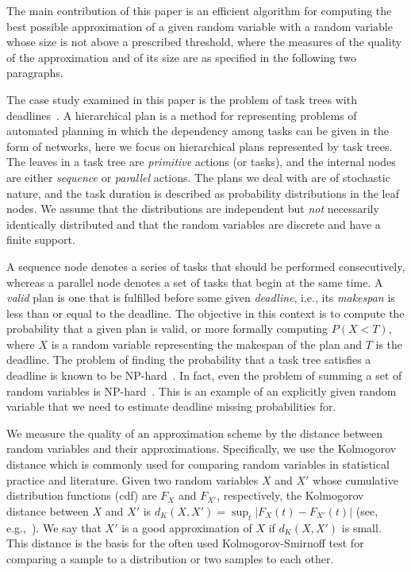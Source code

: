 \documentclass[letterpaper]{article} %
\begin{document}
The main contribution of this paper is an efficient algorithm for computing the best possible approximation of a given random variable with a random variable whose size is not above a prescribed threshold, where the measures of the quality of the approximation and of its size are as specified in the following two paragraphs. 

The case study examined in this paper is the problem of task trees with deadlines~\cite{cohen2015estimating,CohenGW18}. A hierarchical plan is a method for representing problems of automated planning in which the dependency among tasks can be given in the form of networks, here we focus on hierarchical plans represented by task trees. The leaves in a task tree are \emph{primitive} actions (or tasks), and the internal nodes are either \emph{sequence} or \emph{parallel} actions. The plans we deal with are of stochastic nature, and the task duration is described as probability distributions in the leaf nodes. We assume that the distributions are independent but {\em not} necessarily identically distributed and that the random variables are discrete and have a finite support. 

A sequence node denotes a series of tasks that should be performed consecutively, whereas a parallel node denotes a set of tasks that begin at the same time. A \emph{valid} plan is one that is fulfilled before some given \emph{deadline}, i.e., its \emph{makespan} is less than or equal to the deadline. The objective in this context is to compute the probability that a given plan is valid, or more formally computing $P(X<T)$, where $X$ is a random variable representing the makespan of the plan and $T$ is the deadline. The problem of finding the probability that a task tree satisfies a deadline is known to be NP-hard~\cite{cohen2015estimating}. In fact, even the problem of summing a set of random variables is NP-hard~\cite{mohring2001scheduling}. This is an example of an explicitly given random variable that we need to estimate deadline missing probabilities for.

We measure the quality of an approximation scheme by the distance between random variables and their approximations. Specifically, we use the Kolmogorov distance which is  commonly used for comparing random variables in statistical practice and literature. Given two random variables $X$ and $X'$ whose cumulative distribution functions (cdf) are $F_X$ and $F_{X'}$, respectively, the Kolmogorov distance between $X$ and $X'$ is $d_K(X,X')= \sup_t |F_X(t) - F_{X'}(t)|$ (see, e.g.,~\cite{gibbons2011nonparametric}). We say that $X'$ is a good approximation of $X$ if $d_K(X,X')$ is small. This distance is the basis for the often used Kolmogorov-Smirnoff test for comparing a sample to a distribution or two samples to each other. 
\end{document}
